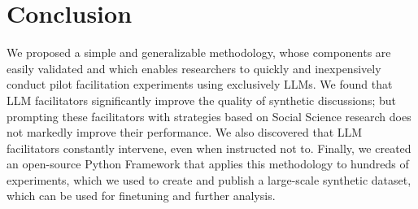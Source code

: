 %
\section{Conclusion}

We proposed a simple and generalizable methodology, whose components are easily validated and which enables researchers to quickly and inexpensively conduct pilot facilitation experiments using exclusively LLMs. We found that LLM facilitators significantly improve the quality of synthetic discussions; but prompting these facilitators with strategies based on Social Science research does not markedly improve their performance. We also discovered that LLM facilitators constantly intervene, even when instructed not to. Finally, we created an open-source Python Framework that applies this methodology to hundreds of experiments, which we used to create and publish a large-scale synthetic dataset, which can be used for finetuning and further analysis.